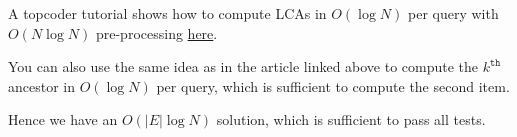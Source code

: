         A topcoder tutorial shows how to compute LCAs in $O(\log N)$ per query
        with $O(N \log N)$ pre-processing
        {\color{blue} \href{https://www.topcoder.com/community/data-science/data-science-tutorials/range-minimum-query-and-lowest-common-ancestor/#Another%20easy%20solution%20in%20O(N%20logN,%20O(logN)}{here}}.

        You can also use the same idea as in the article linked above to compute the $k^{\texttt{th}}$
        ancestor in $O(\log N)$ per query, which is sufficient to compute the second item.

        Hence we have an $O(|E| \log N)$ solution, which is sufficient to pass all tests.